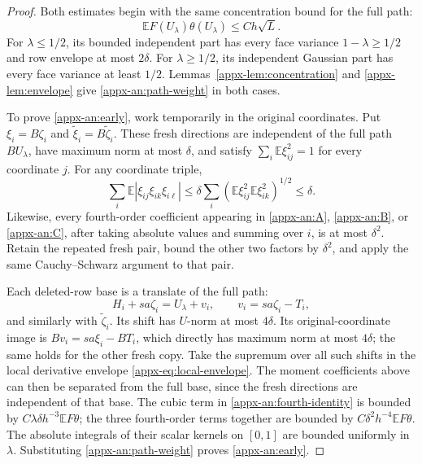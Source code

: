 \documentclass[11pt,letterpaper]{article}
\theoremstyle{remark}
\newcommand{\E}{\mathbb E}
\begin{document}
\begin{proof}
Both estimates begin with the same concentration bound for the full path:
\begin{equation}
 \E F(U_\lambda)\theta(U_\lambda)\le Ch\sqrt L.
 \label{appx-an:path-weight}
\end{equation}
For \(\lambda\le1/2\), its bounded independent part has every face
variance \(1-\lambda\ge1/2\) and row envelope at most \(2\delta\).
For \(\lambda\ge1/2\), its independent Gaussian part has every
face variance at least \(1/2\).  Lemmas~\ref{appx-lem:concentration}
and \ref{appx-lem:envelope} give \eqref{appx-an:path-weight} in both cases.

To prove \eqref{appx-an:early}, work temporarily in the original
coordinates.  Put \(\xi_i=B\zeta_i\) and
\(\widetilde\xi_i=B\widetilde\zeta_i\).  These fresh directions
are independent of the full path \(BU_\lambda\), have maximum norm
at most \(\delta\), and satisfy
\(\sum_i\E\xi_{ij}^2=1\) for every coordinate \(j\).  For any
coordinate triple,
\[
 \sum_i\E|\xi_{ij}\xi_{ik}\xi_{i\ell}|
 \le\delta\sum_i(\E\xi_{ij}^2\E\xi_{ik}^2)^{1/2}
 \le\delta.
\]
Likewise, every fourth-order coefficient appearing in
\eqref{appx-an:A}, \eqref{appx-an:B}, or \eqref{appx-an:C}, after taking absolute
values and summing over \(i\), is at most \(\delta^2\).  Retain
the repeated fresh pair, bound the other two factors by \(\delta^2\),
and apply the same Cauchy--Schwarz argument to that pair.

Each deleted-row base is a translate of the full path:
\[
 H_i+sa\zeta_i=U_\lambda+v_i,
 \qquad v_i=sa\zeta_i-T_i,
\]
and similarly with \(\widetilde\zeta_i\).  Its shift has
\(U\)-norm at most \(4\delta\).  Its original-coordinate image is
\(Bv_i=sa\xi_i-BT_i\), which directly has maximum norm at most
\(4\delta\); the same holds for the other fresh copy.  Take the
supremum over all such shifts in the
local derivative envelope \eqref{appx-eq:local-envelope}.  The moment
coefficients above can then be separated from the full base, since
the fresh directions are independent of that base.  The cubic term
in \eqref{appx-an:fourth-identity} is bounded by
\(C\lambda\delta h^{-3}\E F\theta\); the three fourth-order terms
together are bounded by \(C\delta^2h^{-4}\E F\theta\).
The absolute integrals of their scalar kernels on \([0,1]\) are
bounded uniformly in \(\lambda\).  Substituting
\eqref{appx-an:path-weight} proves \eqref{appx-an:early}.


\end{proof}
\end{document}
